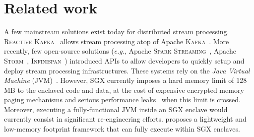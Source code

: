\section{Related work}\label{sec:rw}

A few mainstream solutions exist today for distributed stream processing.
\textsc{Reactive Kafka}~\cite{reactivekafka} allows stream processing atop of Apache \textsc{Kafka}~\cite{apachekafka}.
More recently, few open-source solutions (\emph{e.g.}, Apache \textsc{Spark Streaming}~\cite{apachesparkstreaming}, Apache \textsc{Storm}~\cite{apachestorm}, \textsc{Infinispan}~\cite{infinispan}) introduced APIs to allow developers to quickly setup and deploy stream processing infrastructures.
These systems rely on the \emph{Java Virtual Machine} (JVM)~\cite{lindholm2014java}.
However, SGX currently imposes a hard memory limit of 128\,MB to the enclaved code and data, at the cost of expensive encrypted memory paging mechanisms and serious performance leaks~\cite{pires_scbr:2016,brenner_securekeeper:_2016} when this limit is crossed.
Moreover, executing a fully-functional JVM inside an SGX enclave would currently consist in significant re-engineering efforts.
\SYS{} proposes a lightweight and low-memory footprint framework that can fully execute within SGX enclaves.